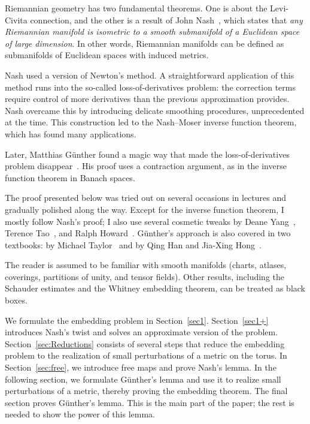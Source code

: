 \thispagestyle{empty}

\begin{abstract}
We present a proof of Nash's smooth embedding theorem with an emphasis on accessibility and rigor.
\end{abstract}

Riemannian geometry has two fundamental theorems.
One is about the Levi-Civita connection, and the other is a result of John Nash~\cite{nash-1956}, which states that \textit{any Riemannian manifold is isometric to a smooth submanifold of a Euclidean space of large dimension}.
In other words, Riemannian manifolds can be defined as submanifolds of Euclidean spaces with induced metrics.

Nash used a version of Newton's method.
A straightforward application of this method runs into the so-called loss-of-derivatives problem: the correction terms require control of more derivatives than the previous approximation provides.
Nash overcame this by introducing delicate smoothing procedures, unprecedented at the time.
This construction led to the Nash--Moser inverse function theorem, which has found many applications.

Later, Matthias Günther found a magic way that made the loss-of-derivatives problem disappear~\cite{gunter}.
His proof uses a contraction argument, as in the inverse function theorem in Banach spaces.

The proof presented below was tried out on several occasions in lectures and gradually polished along the way.
Except for the inverse function theorem, I mostly follow Nash's proof;
I also use several cosmetic tweaks by
Deane Yang~\cite{yang},
Terence Tao~\cite{tao}, and
Ralph Howard~\cite{howard}.
Günther's approach is also covered in two textbooks: by
Michael Taylor~\cite{taylor} and by
Qing Han and Jia-Xing Hong~\cite{han-hong}.

The reader is assumed to be familiar with smooth manifolds (charts, atlases, coverings, partitions of unity, and tensor fields).
Other results, including the Schauder estimates and the Whitney embedding theorem, can be treated as black boxes.

We formulate the embedding problem in Section~\ref{sec1}.
Section~\ref{sec1+} introduces Nash's twist and solves an approximate version of the problem.
Section~\ref{sec:Reductions} consists of several steps that reduce the embedding problem to the realization of small perturbations of a metric on the torus.
In Section~\ref{sec:free}, we introduce free maps and prove Nash's lemma.
In the following section, we formulate Günther's lemma and use it to realize small perturbations of a metric, thereby proving the embedding theorem.
The final section proves Günther's lemma.
This is the main part of the paper;
the rest is needed to show the power of this lemma.

